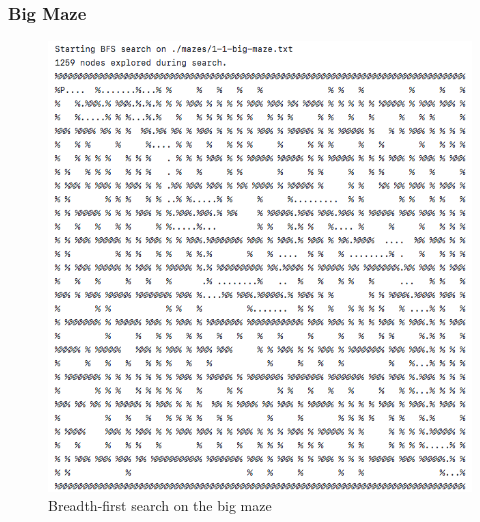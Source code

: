 \documentclass[titlepage]{article}
\begin{document}
\subsubsection{Big Maze}
\begin{figure}[h!]
\includegraphics[width=\linewidth]{bfsbig.png}
\caption{Breadth-first search on the big maze}
\label{fig:BFSbig}
\end{figure}

\newpage
\end{document}
